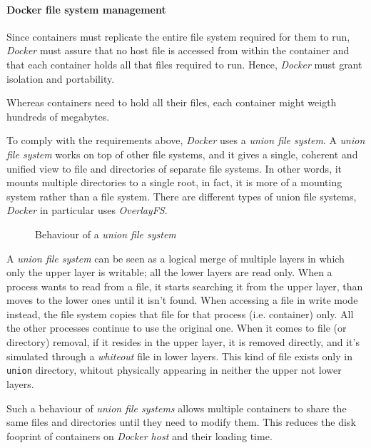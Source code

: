 \paragraph{Docker file system management}
Since containers must replicate the entire file system required for them to
run, \emph{Docker} must assure that no host  file is accessed from within the
container and that each container holds all that files required to run.
Hence, \emph{Docker} must grant isolation and portability.

\begin{note}
    Whereas containers need to hold all their files, each container might
    weigth hundreds of megabytes.
\end{note}

\noindent
To comply with the requirements above, \emph{Docker} uses a \emph{union file
system}. A \emph{union file system} works on top of other file systems, and
it gives a single, coherent and unified view to file and directories of
separate file systems. In other words, it mounts multiple directories to a
single root, in fact, it is more of a mounting system rather than a file
system. There are different types of union file systems, \emph{Docker} in
particular uses \emph{OverlayFS}.

\begin{figure}[h!]
    \centering
    \caption{Behaviour of a \emph{union file system}}
\end{figure}

\noindent
A \emph{union file system} can be seen as a logical merge of multiple layers in
which only the upper layer is writable; all the lower layers are read only.
When a process wants to read from a file, it starts searching it from the
upper layer, than moves to the lower ones until it isn't found. When accessing
a file in write mode instead, the file system copies that file for that process
(i.e. container) only. All the other processes continue to use the original one.
When it comes to file (or directory) removal, if it resides in the upper layer,
it is removed directly, and it's simulated through a \emph{whiteout} file in
lower layers. This kind of file exists only in \texttt{union} directory, whitout
physically appearing in neither the upper not lower layers.

Such a behaviour of \emph{union file systems} allows multiple containers to
share the same files and directories until they need to modify them. This
reduces the disk fooprint of containers on \emph{Docker host} and their loading
time.

